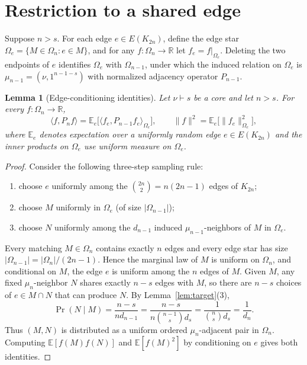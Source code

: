 \documentclass[11pt]{article}
\newtheorem{lemma}[theorem]{Lemma}
\theoremstyle{remark}
\newcommand{\R}{\mathbb{R}}
\newcommand{\E}{\mathbb{E}}
\begin{document}
\section{Restriction to a shared edge}\label{sec:restriction}

Suppose $n > s$. For each edge $e \in E(K_{2n})$, define the edge star
$\Omega_e = \{M \in \Omega_n : e \in M\}$, and for any
$f \colon \Omega_n \to \R$ let $f_e = f|_{\Omega_e}$. Deleting the two
endpoints of $e$ identifies $\Omega_e$ with $\Omega_{n-1}$, under which the
induced relation on $\Omega_e$ is $\mu_{n-1} = (\nu, 1^{n-1-s})$ with
normalized adjacency operator $P_{n-1}$.

\begin{lemma}[Edge-conditioning identities]\label{lem:conditioning}
Let $\nu \vdash s$ be a core and let $n > s$. For every
$f \colon \Omega_n \to \R$,
\[
  \langle f, P_n f \rangle = \E_e\bigl[\langle f_e, P_{n-1} f_e \rangle_{\Omega_e}\bigr],
  \qquad
  \|f\|^2 = \E_e\bigl[\|f_e\|_{\Omega_e}^2\bigr],
\]
where $\E_e$ denotes expectation over a uniformly random edge $e \in E(K_{2n})$
and the inner products on $\Omega_e$ use uniform measure on $\Omega_e$.
\end{lemma}

\begin{proof}
Consider the following three-step sampling rule:
\begin{enumerate}
  \item choose $e$ uniformly among the $\binom{2n}{2} = n(2n-1)$ edges of $K_{2n}$;
  \item choose $M$ uniformly in $\Omega_e$ (of size $|\Omega_{n-1}|$);
  \item choose $N$ uniformly among the $d_{n-1}$ induced $\mu_{n-1}$-neighbors
  of $M$ in $\Omega_e$.
\end{enumerate}
Every matching $M \in \Omega_n$ contains exactly $n$ edges and every edge star
has size $|\Omega_{n-1}| = |\Omega_n| / (2n-1)$. Hence the marginal law of $M$
is uniform on $\Omega_n$, and conditional on $M$, the edge $e$ is uniform among
the $n$ edges of $M$. Given $M$, any fixed $\mu_n$-neighbor $N$ shares exactly
$n - s$ edges with $M$, so there are $n - s$ choices of $e \in M \cap N$ that
can produce $N$. By Lemma~\ref{lem:target}(3),
\[
  \Pr(N \mid M)
  = \frac{n - s}{n d_{n-1}}
  = \frac{n - s}{n \binom{n-1}{s} d_s}
  = \frac{1}{\binom{n}{s} d_s}
  = \frac{1}{d_n}.
\]
Thus $(M, N)$ is distributed as a uniform ordered $\mu_n$-adjacent pair in
$\Omega_n$. Computing $\E[f(M)f(N)]$ and $\E[f(M)^2]$ by conditioning on $e$
gives both identities.
\end{proof}
\end{document}
